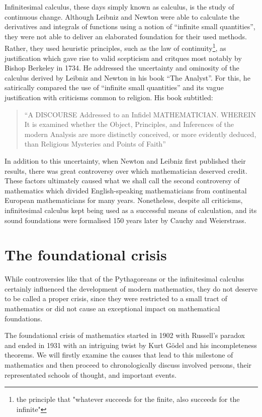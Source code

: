 \documentclass[hidelinks]{article}
\begin{document}
Infinitesimal calculus, these days simply known as calculus, is the study of continuous change. Although Leibniz and Newton were able to calculate the derivatives and integrals of functions using a notion of ``infinite small quantities'', they were not able to deliver an elaborated foundation for their used methods. Rather, they used heuristic principles, such as the law of continuity\footnote{the principle that "whatever succeeds for the finite, also succeeds for the infinite"}, as justification which gave rise to valid scepticism and critques most notably by Bishop Berkeley in 1734. He addressed the uncertainty and ominosity of the calculus derived by Leibniz and Newton in his book ``The Analyst''. For this, he satirically compared the use of ``infinite small quantities'' and its vague justification with criticisms common to religion. His book subtitled:
\begin{quote}
	``A DISCOURSE Addressed to an Infidel MATHEMATICIAN\@. WHEREIN It is examined whether the Object, Principles, and Inferences of the modern Analysis are more distinctly conceived, or more evidently deduced, than Religious Mysteries and Points of Faith''
\end{quote}
In addition to this uncertainty, when Newton and Leibniz first published their results, there was great controversy over which mathematician deserved credit. These factors ultimately caused what we shall call the second controversy of mathematics which divided English-speaking mathematicians from continental European mathematicians for many years. Nonetheless, despite all criticisms, infinitesimal calculus kept being used as a successful means of calculation, and its sound foundations were formalised 150 years later by Cauchy and Weierstrass.

\section{The foundational crisis}
While controversies like that of the Pythagoreans or the infinitesimal calculus certainly influenced the development of modern mathematics, they do not deserve to be called a proper crisis, since they were restricted to a small tract of mathematics or did not cause an exceptional impact on mathematical foundations.

The foundational crisis of mathematics started in 1902 with Russell's paradox and ended in 1931 with an intriguing twist by Kurt Gödel and his incompleteness theorems.
We will firstly examine the causes that lead to this milestone of mathematics and then proceed to chronologically discuss involved persons, their representated schools of thought, and important events.
\end{document}
